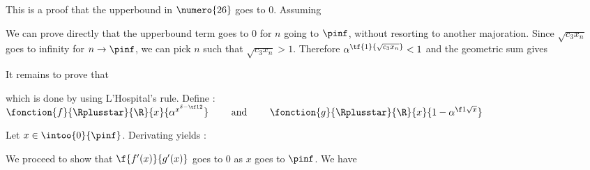  This is a proof that the upperbound 
in $\numero{26}$ goes to 0. Assuming



\noindent We can prove directly that the upperbound term goes to 0 
for $n$ going to $\pinf$,
without resorting to another majoration.
Since $\sqrt{c_3 x_n}$ goes to infinity for $n \rightarrow \pinf$,
we can pick $n$ such that $\sqrt{c_3 x_n} > 1$. Therefore
$\alpha^{\tf{1}{\sqrt{c_3 x_n}}} < 1$ and the geometric sum gives


\noindent It remains to prove that 

which is done by using L'Hospital's rule.
Define :
\centers
    {$ \fonction
            {f}
            { \Rplusstar }
            { \R }
            { x }
            { \alpha^{ x^{ \delta - \tf12 } } }
      \qquad \text{ and } \qquad
      \fonction
        {g}
        { \Rplusstar }
        { \R }
        { x }
        {  1 - \alpha^{ \f1{ \sqrt{x} } } } $}

\noindent Let $x \in \intoo{0}{\pinf}$. Derivating yields :


\noindent We proceed to show that $\f{f'(x)}{g'(x)}$ goes to 0 as $x$ goes
to $\pinf$. We have


